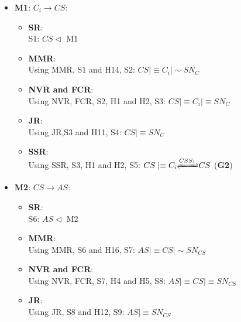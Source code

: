 \documentclass[journal,article,submit,moreauthors,pdftex]{Definitions/mdpi}
\begin{document}
\begin{itemize}
\begin{itemize} [topsep=0pt,itemsep=-1ex,partopsep=1ex,parsep=1ex]
   \scriptsize
    \item \textbf{M1}: $C_i \rightarrow CS$:
                                    \begin{itemize}[topsep=0pt,itemsep=-1ex,partopsep=1ex,parsep=1ex]
                                    \item \textbf{SR}:\\
                                    S1: $CS \lhd$ M1
                                    \item \textbf{MMR}:\\
                                    Using MMR, S1 and H14, S2: $CS \mid\equiv C_i \mid \sim SN_C$
                                    \item \textbf{NVR and FCR}:\\
                                     Using NVR, FCR, S2, H1 and H2, S3: $CS \mid\equiv C_i \mid\equiv SN_C$
                                     \item \textbf{JR}:\\
                                     Using JR,S3 and H11, S4: $CS \mid\equiv SN_C$
                                     \item \textbf{SSR}:\\
                                     Using SSR, S3, H1 and H2, S5: $CS \mid\equiv C_i {\xrightleftharpoons{CSS_1}} CS$ (\textbf{G2})
                                    \end{itemize}
     \item \textbf{M2}: $CS \rightarrow AS$:
                                   \begin{itemize}[topsep=0pt,itemsep=-1ex,partopsep=1ex,parsep=1ex]
                                    \item \textbf{SR}:\\
                                    S6: $AS \lhd$ M2
                                    \item \textbf{MMR}:\\
                                    Using MMR, S6 and H16, S7: $AS \mid\equiv CS \mid \sim SN_{CS}$
                                    \item \textbf{NVR and FCR}:\\
                                     Using NVR, FCR, S7, H4 and H5, S8: $AS \mid\equiv CS \mid\equiv SN_{CS}$
                                     \item \textbf{JR}:\\
                                     Using JR, S8 and H12, S9: $AS \mid\equiv SN_{CS}$

\end{itemize}
\end{itemize}
\end{itemize}
\end{document}
